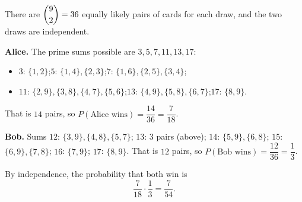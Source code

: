 There are $\dbinom92=36$ equally likely pairs of cards for each draw, and the two draws are independent.

\textbf{Alice.} The prime sums possible are $3,5,7,11,13,17$:
\begin{itemize}
\item $3$: $\{1,2\}$;\quad $5$: $\{1,4\},\{2,3\}$;\quad $7$: $\{1,6\},\{2,5\},\{3,4\}$;
\item $11$: $\{2,9\},\{3,8\},\{4,7\},\{5,6\}$;\quad $13$: $\{4,9\},\{5,8\},\{6,7\}$;\quad $17$: $\{8,9\}$.
\end{itemize}
That is $14$ pairs, so $P(\text{Alice wins})=\dfrac{14}{36}=\dfrac7{18}$.

\textbf{Bob.} Sums $12$: $\{3,9\},\{4,8\},\{5,7\}$; $13$: $3$ pairs (above); $14$: $\{5,9\},\{6,8\}$; $15$: $\{6,9\},\{7,8\}$; $16$: $\{7,9\}$; $17$: $\{8,9\}$. That is $12$ pairs, so $P(\text{Bob wins})=\dfrac{12}{36}=\dfrac13$.

By independence, the probability that both win is
\[\dfrac7{18}\cdot\dfrac13=\boxed{\dfrac{7}{54}}.\]

